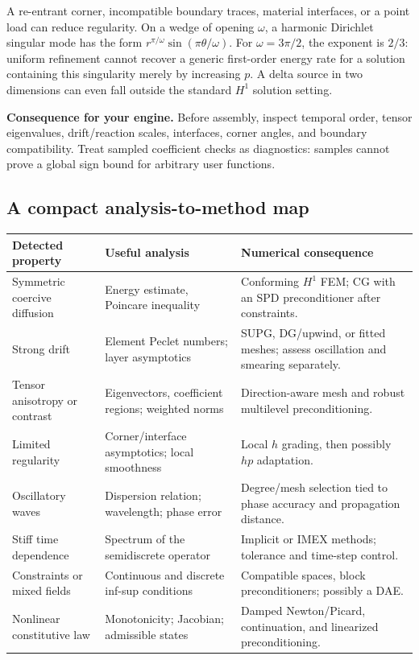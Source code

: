 \documentclass[11pt,a4paper]{article}
\newcommand{\decision}[1]{\par\smallskip\noindent\textcolor{accent}{\textbf{Consequence for your engine.}} #1\par}
\begin{document}
A re-entrant corner, incompatible boundary traces, material interfaces, or a point load can reduce regularity. On a wedge of opening $\omega$, a harmonic Dirichlet singular mode has the form $r^{\pi/\omega}\sin(\pi\theta/\omega)$. For $\omega=3\pi/2$, the exponent is $2/3$: uniform refinement cannot recover a generic first-order energy rate for a solution containing this singularity merely by increasing $p$. A delta source in two dimensions can even fall outside the standard $H^1$ solution setting.

\decision{Before assembly, inspect temporal order, tensor eigenvalues, drift/reaction scales, interfaces, corner angles, and boundary compatibility. Treat sampled coefficient checks as diagnostics: samples cannot prove a global sign bound for arbitrary user functions.}

\subsection{A compact analysis-to-method map}
\begin{longtable}{P{0.22\textwidth}P{0.32\textwidth}P{0.38\textwidth}}
\toprule
Detected property & Useful analysis & Numerical consequence\\
\midrule\endhead
Symmetric coercive diffusion & Energy estimate, Poincare inequality & Conforming $H^1$ FEM; CG with an SPD preconditioner after constraints.\\
Strong drift & Element Peclet numbers; layer asymptotics & SUPG, DG/upwind, or fitted meshes; assess oscillation and smearing separately.\\
Tensor anisotropy or contrast & Eigenvectors, coefficient regions; weighted norms & Direction-aware mesh and robust multilevel preconditioning.\\
Limited regularity & Corner/interface asymptotics; local smoothness & Local $h$ grading, then possibly $hp$ adaptation.\\
Oscillatory waves & Dispersion relation; wavelength; phase error & Degree/mesh selection tied to phase accuracy and propagation distance.\\
Stiff time dependence & Spectrum of the semidiscrete operator & Implicit or IMEX methods; tolerance and time-step control.\\
Constraints or mixed fields & Continuous and discrete inf-sup conditions & Compatible spaces, block preconditioners; possibly a DAE.\\
Nonlinear constitutive law & Monotonicity; Jacobian; admissible states & Damped Newton/Picard, continuation, and linearized preconditioning.\\
\bottomrule
\end{longtable}
\end{document}
